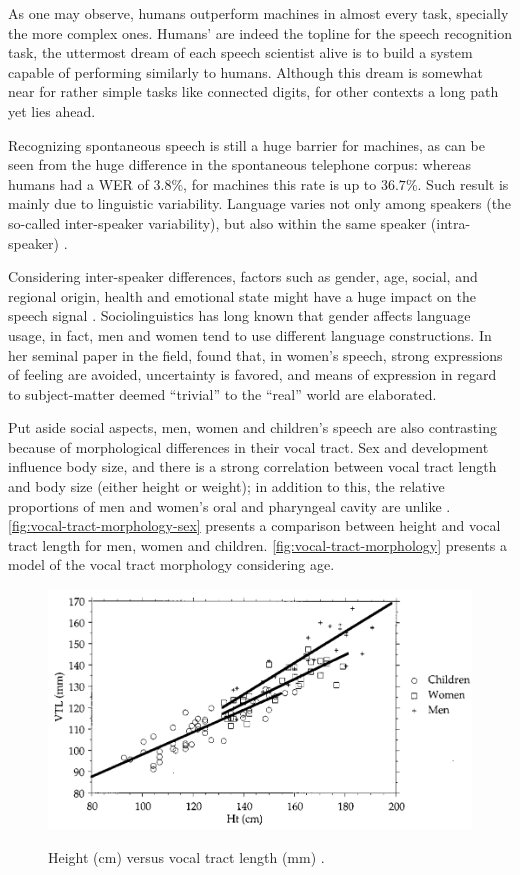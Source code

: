 As one may observe, humans outperform machines in almost every task, specially the more complex ones. 
Humans' are indeed the topline for the speech recognition task, the uttermost dream of each speech 
scientist alive is to build a system capable of performing similarly to humans. Although this dream is somewhat near
for rather simple tasks like connected digits, for other contexts a long path yet lies ahead. 

Recognizing spontaneous speech is still a huge barrier for machines, as can be seen from the huge difference
in the spontaneous telephone corpus: whereas humans had a WER of $3.8\%$, for machines this rate is up to $36.7\%$.
Such result is mainly due to linguistic variability. Language varies not only among speakers (the so-called 
inter-speaker variability), but also within the same speaker (intra-speaker) \citep{Benzeghiba2007}. 

Considering inter-speaker differences, factors such as gender, age, social, and regional 
origin, health and emotional state might have a huge impact on the speech signal \citep{Benzeghiba2007}.
Sociolinguistics has long known that gender affects language usage, in fact, men and women tend to use different language constructions.
In her seminal paper in the field, \citeauthor{Lakoff1973} \citep{Lakoff1973} found that, in women's speech, strong expressions 
of feeling are avoided, uncertainty is favored, and means of expression in regard to subject-matter deemed ``trivial'' to the 
``real'' world are elaborated. 

Put aside social aspects, men, women and children's speech are also contrasting because of morphological differences
in their vocal tract. Sex and development influence body size, and there is a strong correlation between vocal tract length and body size 
(either height or weight); in addition to this, the relative proportions of men and women's oral and pharyngeal cavity are unlike 
\cite{Fitch1999}. \autoref{fig:vocal-tract-morphology-sex} presents a comparison between height and
vocal tract length for men, women and children. \autoref{fig:vocal-tract-morphology} presents a model of the vocal tract morphology considering
age.

\begin{figure}[H]
        \myfloatalign
        {\includegraphics[width=.66\linewidth]{gfx/vocal-tract-size-sex.png}}
        \caption{Height (cm) versus vocal tract length (mm) \cite{Fitch1999}.}
        \label{fig:vocal-tract-morphology-sex}
\end{figure}

